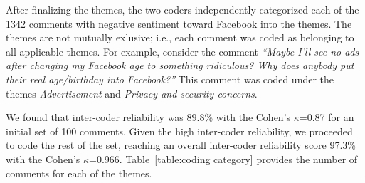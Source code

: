 After finalizing the themes, the two coders independently categorized each of the 1342 comments with negative sentiment toward Facebook into the themes. The themes are not mutually exlusive; i.e., each comment was coded as belonging to all applicable themes. For example, consider the comment \textit{``Maybe I'll see no ads after changing my Facebook age to something ridiculous? Why does anybody put their real age/birthday into Facebook?''} This comment was coded under the themes \textit{Advertisement} and \textit{Privacy and security concerns}.

We found that inter-coder reliability was 89.8\% with the Cohen's $\kappa$=0.87 for an initial set of 100 comments. Given the high inter-coder reliability, we proceeded to code the rest of the set, reaching an overall inter-coder reliability score 97.3\% with the Cohen's $\kappa$=0.966. Table~\ref{table:coding category} provides the number of comments for each of the themes.



